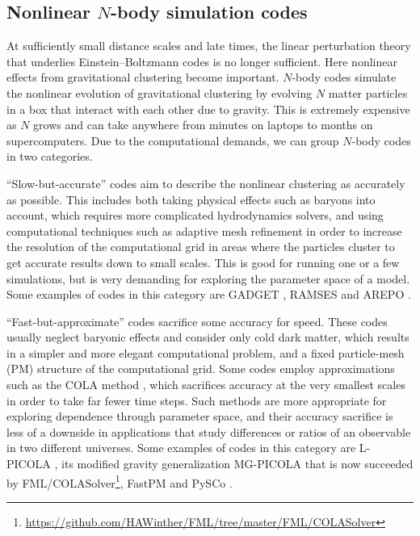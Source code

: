 \documentclass[USenglish, thumbmarks]{uiophdthesis} %
\newcommand\EB{Einstein--Boltzmann}
\begin{document}
\subsection{Nonlinear \texorpdfstring{$N$}{N}-body simulation codes}

At sufficiently small distance scales and late times,
the linear perturbation theory that underlies \EB{} codes is no longer sufficient.
Here nonlinear effects from gravitational clustering become important.
$N$-body codes simulate the nonlinear evolution of gravitational clustering
by evolving $N$ matter particles in a box that interact with each other due to gravity.
This is extremely expensive as $N$ grows and can take anywhere from minutes on laptops to months on supercomputers.
Due to the computational demands, we can group $N$-body codes in two categories.

\enquote{Slow-but-accurate} codes aim to describe the nonlinear clustering as accurately as possible.
This includes both taking physical effects such as baryons into account,
which requires more complicated hydrodynamics solvers,
and using computational techniques such as adaptive mesh refinement in order to
increase the resolution of the computational grid in areas where the particles cluster
to get accurate results down to small scales.
This is good for running one or a few simulations,
but is very demanding for exploring the parameter space of a model.
Some examples of codes in this category are
GADGET \cite{springelGADGETCodeCollisionless2001},
RAMSES \cite{teyssierCosmologicalHydrodynamicsAdaptive2002a} and
AREPO \cite{weinbergerArepoPublicCode2020}.

\enquote{Fast-but-approximate} codes sacrifice some accuracy for speed.
These codes usually neglect baryonic effects and consider only cold dark matter, which results in a simpler and more elegant computational problem,
and a fixed particle-mesh (PM) structure of the computational grid.
Some codes employ approximations such as the COLA method \cite{tassevSolvingLargeScale2013b},
which sacrifices accuracy at the very smallest scales in order to take far fewer time steps.
Such methods are more appropriate for exploring dependence through parameter space,
and their accuracy sacrifice is less of a downside in applications that study differences or ratios of an observable in two different universes.
Some examples of codes in this category are
L-PICOLA \cite{howlettLPICOLAParallelCode2015},
its modified gravity generalization MG-PICOLA \cite{wintherCOLAScaledependentGrowth2017}
that is now succeeded by
FML/COLASolver\footnote{\url{https://github.com/HAWinther/FML/tree/master/FML/COLASolver}},
FastPM \cite{fengFastPMNewScheme2016} and
PySCo \cite{bretonPySCoFastParticleMesh2025}.
\end{document}
